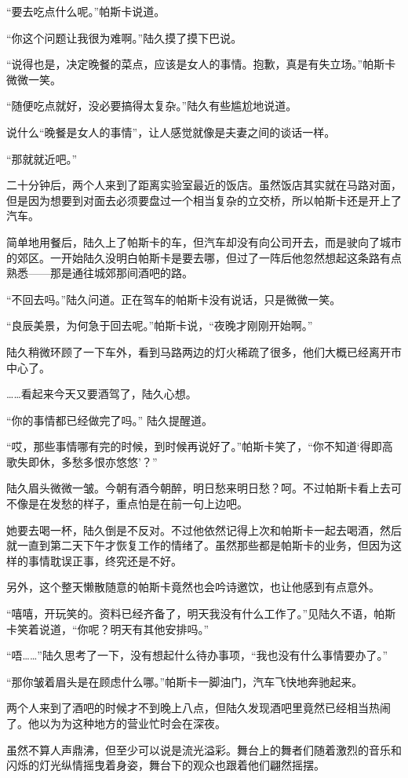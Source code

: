 “要去吃点什么呢。”帕斯卡说道。

“你这个问题让我很为难啊。”陆久摸了摸下巴说。

“说得也是，决定晚餐的菜点，应该是女人的事情。抱歉，真是有失立场。”帕斯卡微微一笑。

“随便吃点就好，没必要搞得太复杂。”陆久有些尴尬地说道。

说什么“晚餐是女人的事情”，让人感觉就像是夫妻之间的谈话一样。

“那就就近吧。”

二十分钟后，两个人来到了距离实验室最近的饭店。虽然饭店其实就在马路对面，但是因为想要到对面去必须要盘过一个相当复杂的立交桥，所以帕斯卡还是开上了汽车。

简单地用餐后，陆久上了帕斯卡的车，但汽车却没有向公司开去，而是驶向了城市的郊区。一开始陆久没明白帕斯卡是要去哪，但过了一阵后他忽然想起这条路有点熟悉——那是通往城郊那间酒吧的路。

“不回去吗。”陆久问道。正在驾车的帕斯卡没有说话，只是微微一笑。

“良辰美景，为何急于回去呢。”帕斯卡说，“夜晚才刚刚开始啊。”

陆久稍微环顾了一下车外，看到马路两边的灯火稀疏了很多，他们大概已经离开市中心了。

……看起来今天又要酒驾了，陆久心想。

“你的事情都已经做完了吗。” 陆久提醒道。

“哎，那些事情哪有完的时候，到时候再说好了。”帕斯卡笑了，“你不知道‘得即高歌失即休，多愁多恨亦悠悠’？”

陆久眉头微微一皱。今朝有酒今朝醉，明日愁来明日愁？呵。不过帕斯卡看上去可不像是在发愁的样子，重点怕是在前一句上边吧。

她要去喝一杯，陆久倒是不反对。不过他依然记得上次和帕斯卡一起去喝酒，然后就一直到第二天下午才恢复工作的情绪了。虽然那些都是帕斯卡的业务，但因为这样的事情耽误正事，终究还是不好。

另外，这个整天懒散随意的帕斯卡竟然也会吟诗邀饮，也让他感到有点意外。

“嘻嘻，开玩笑的。资料已经齐备了，明天我没有什么工作了。”见陆久不语，帕斯卡笑着说道，“你呢？明天有其他安排吗。”

“唔……”陆久思考了一下，没有想起什么待办事项，“我也没有什么事情要办了。”

“那你皱着眉头是在顾虑什么哪。”帕斯卡一脚油门，汽车飞快地奔驰起来。

两个人来到了酒吧的时候才不到晚上八点，但陆久发现酒吧里竟然已经相当热闹了。他以为为这种地方的营业忙时会在深夜。

虽然不算人声鼎沸，但至少可以说是流光溢彩。舞台上的舞者们随着激烈的音乐和闪烁的灯光纵情摇曳着身姿，舞台下的观众也跟着他们翩然摇摆。

